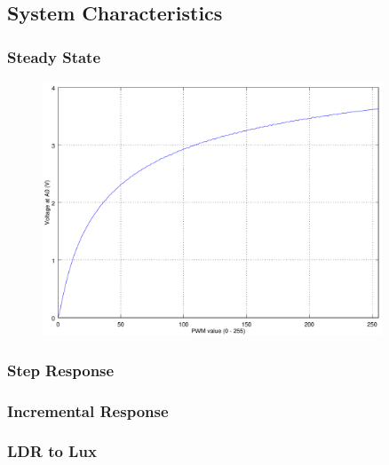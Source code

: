 \subsection{System Characteristics}
\label{sec:SystemCharacteristics}

\subsubsection{Steady State}
\label{sub:SteadyState}

\begin{figure}[h]
    \centering
    \includegraphics[width=0.9\textwidth]{img/steady_state}
    \caption{}
    \label{fig:}
\end{figure}

\begin{figure}[h]
    \centering
    \resizebox{\textwidth}{!}{}
    \caption{}
    \label{fig:}
\end{figure}

\subsubsection{Step Response}
\label{sub:StepResponse}

\subsubsection{Incremental Response}
\label{sub:IncrementalResponse}

\subsubsection{LDR to Lux}
\label{sub:LDRtoLux}
